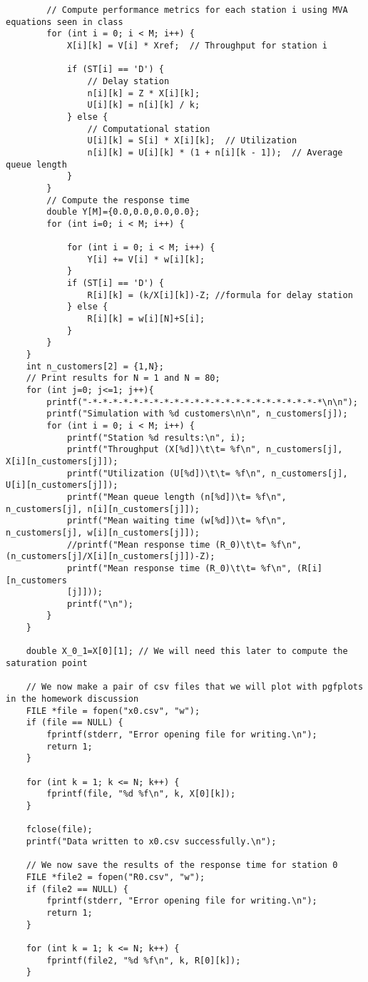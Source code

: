 \documentclass[12pt]{article}
\begin{document}
\begin{verbatim}
		// Compute performance metrics for each station i using MVA equations seen in class
		for (int i = 0; i < M; i++) {
			X[i][k] = V[i] * Xref;  // Throughput for station i
			
			if (ST[i] == 'D') {
				// Delay station
				n[i][k] = Z * X[i][k];
				U[i][k] = n[i][k] / k;
			} else {
				// Computational station
				U[i][k] = S[i] * X[i][k];  // Utilization
				n[i][k] = U[i][k] * (1 + n[i][k - 1]);  // Average queue length
			}
		}
		// Compute the response time
		double Y[M]={0.0,0.0,0.0,0.0};
		for (int i=0; i < M; i++) {
			
			for (int i = 0; i < M; i++) {
				Y[i] += V[i] * w[i][k];
			}
			if (ST[i] == 'D') {
				R[i][k] = (k/X[i][k])-Z; //formula for delay station
			} else {
				R[i][k] = w[i][N]+S[i];
			}
		}
	}
	int n_customers[2] = {1,N};
	// Print results for N = 1 and N = 80;
	for (int j=0; j<=1; j++){
		printf("-*-*-*-*-*-*-*-*-*-*-*-*-*-*-*-*-*-*-*-*-*-*-*\n\n");
		printf("Simulation with %d customers\n\n", n_customers[j]);
		for (int i = 0; i < M; i++) {
			printf("Station %d results:\n", i);
			printf("Throughput (X[%d])\t\t= %f\n", n_customers[j], X[i][n_customers[j]]);
			printf("Utilization (U[%d])\t\t= %f\n", n_customers[j], U[i][n_customers[j]]);
			printf("Mean queue length (n[%d])\t= %f\n", n_customers[j], n[i][n_customers[j]]);
			printf("Mean waiting time (w[%d])\t= %f\n", n_customers[j], w[i][n_customers[j]]);
			//printf("Mean response time (R_0)\t\t= %f\n", (n_customers[j]/X[i][n_customers[j]])-Z);
			printf("Mean response time (R_0)\t\t= %f\n", (R[i][n_customers
			[j]])); 
			printf("\n");
		}
	}
	
	double X_0_1=X[0][1]; // We will need this later to compute the saturation point
	
	// We now make a pair of csv files that we will plot with pgfplots in the homework discussion
	FILE *file = fopen("x0.csv", "w");
	if (file == NULL) {
		fprintf(stderr, "Error opening file for writing.\n");
		return 1;
	}
	
	for (int k = 1; k <= N; k++) {
		fprintf(file, "%d %f\n", k, X[0][k]);
	}
	
	fclose(file);
	printf("Data written to x0.csv successfully.\n");
	
	// We now save the results of the response time for station 0
	FILE *file2 = fopen("R0.csv", "w");
	if (file2 == NULL) {
		fprintf(stderr, "Error opening file for writing.\n");
		return 1;
	}
	
	for (int k = 1; k <= N; k++) {
		fprintf(file2, "%d %f\n", k, R[0][k]);
	}
	

\end{verbatim}
\end{document}
